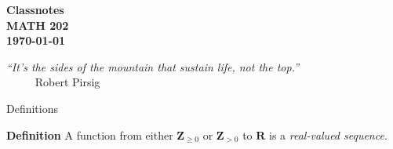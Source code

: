 \documentclass[portrait,fleqn,12pt]{beamer}
\newcommand{\reals}{\mathbf{R}}
\newcommand{\integers}{\mathbf{Z}}
\newenvironment{define}[1]{
  \textbf{Definition} #1}{}
\begin{document}
\begin{frame}
\small
\begin{flushleft} 
{ \bf
Classnotes \\
MATH 202 \\
\today }


\emph{“It's the sides of the mountain that sustain life, not the top.”} \\
$\phantom{xxxx}$ \hfill {\sc Robert  Pirsig} 
\end{flushleft}
\end{frame}


\begin{frame}{Definitions}


\begin{define} A function from either \(\integers_{\geq 0}\) or \(\integers_{> 0}\)
to \(\reals\) is a \emph{real-valued sequence}.
\end{define}
\vfill

\end{frame}
\end{document}
